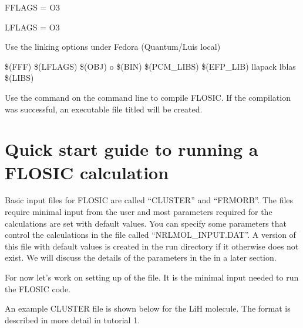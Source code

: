 \documentclass[letterpaper,10pt,english,openany,oneside]{sphinxmanual}
\begin{document}
\sphinxAtStartPar
FFLAGS = \sphinxhyphen{}O3

\sphinxAtStartPar
LFLAGS = \sphinxhyphen{}O3

\sphinxAtStartPar
{} Use the linking options under Fedora (Quantum/Luis local)

\sphinxAtStartPar
\$(FFF) \$(LFLAGS) \$(OBJ) \sphinxhyphen{}o \$(BIN) \$(PCM\_LIBS) \$(EFP\_LIB) \sphinxhyphen{}llapack \sphinxhyphen{}lblas \$(LIBS)

\sphinxAtStartPar
Use the  command on the command line to compile FLOSIC. If the compilation was successful, an executable file titled  will be created.


\chapter{Quick start guide to running a FLOSIC calculation}
\label{\detokenize{docs/setupcal:quick-start-guide-to-running-a-flosic-calculation}}\label{\detokenize{docs/setupcal:setup}}\label{\detokenize{docs/setupcal::doc}}
\sphinxAtStartPar
Basic input files for FLOSIC are called “CLUSTER” and “FRMORB”.
The files require minimal input from the user and most parameters required for the calculations are set with
default values. You can specify some parameters that control the calculations in the file called “NRLMOL\_INPUT.DAT”.
A version of this file with default values is created in the run directory if it otherwise does not exist. We will
discuss the details of the parameters in the  in a later section.

\sphinxAtStartPar
For now let’s work on setting up of the  file. It is the minimal input needed to run the FLOSIC code.

\sphinxAtStartPar
An example CLUSTER file is shown below for the LiH molecule. The format is described in more detail in tutorial 1.
\end{document}
